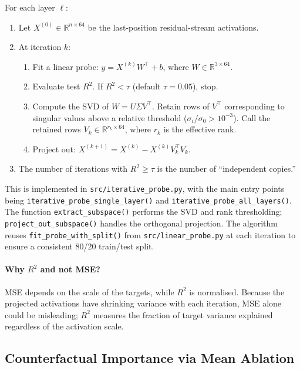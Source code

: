 \documentclass[11pt]{article}
\newcommand{\code}[1]{\texttt{#1}}
\begin{document}
For each layer $\ell$:
\begin{enumerate}
  \item Let $X^{(0)} \in \mathbb{R}^{n \times 64}$ be the last-position residual-stream activations.
  \item At iteration $k$:
    \begin{enumerate}
      \item Fit a linear probe: $\hat{y} = X^{(k)} W^\top + b$, where $W \in \mathbb{R}^{3 \times 64}$.
      \item Evaluate test $R^2$.  If $R^2 < \tau$ (default $\tau = 0.05$), stop.
      \item Compute the SVD of $W = U \Sigma V^\top$.  Retain rows of $V^\top$ corresponding to singular values above a relative threshold ($\sigma_i / \sigma_0 > 10^{-3}$).  Call the retained rows $V_k \in \mathbb{R}^{r_k \times 64}$, where $r_k$ is the effective rank.
      \item Project out: $X^{(k+1)} = X^{(k)} - X^{(k)} V_k^\top V_k$.
    \end{enumerate}
  \item The number of iterations with $R^2 \geq \tau$ is the number of ``independent copies.''
\end{enumerate}

This is implemented in \code{src/iterative\_probe.py}, with the main entry points being \code{iterative\_probe\_single\_layer()} and \code{iterative\_probe\_all\_layers()}.  The function \code{extract\_subspace()} performs the SVD and rank thresholding; \code{project\_out\_subspace()} handles the orthogonal projection.  The algorithm reuses \code{fit\_probe\_with\_split()} from \code{src/linear\_probe.py} at each iteration to ensure a consistent 80/20 train/test split.

\paragraph{Why $R^2$ and not MSE?}
MSE depends on the scale of the targets, while $R^2$ is normalised.  Because the projected activations have shrinking variance with each iteration, MSE alone could be misleading; $R^2$ measures the fraction of target variance explained regardless of the activation scale.

\subsection{Counterfactual Importance via Mean Ablation}
\label{sec:counterfactual}
\end{document}

